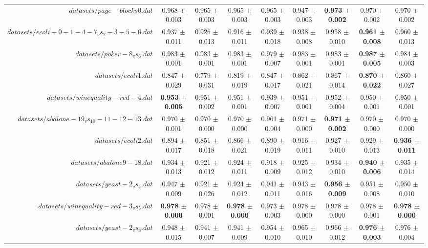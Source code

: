 \begin{table}[!ht]
{\begin{tabular}{r c c c c c c c c}
$datasets/page-blocks0.dat$ & 0.968 $\pm$ 0.003 & 0.965 $\pm$ 0.003 & 0.965 $\pm$ 0.003 & 0.965 $\pm$ 0.003 & 0.947 $\pm$ 0.003 & \textbf{0.973 $\pm$ 0.002} & 0.970 $\pm$ 0.002 & 0.970 $\pm$ 0.002 \\
$datasets/ecoli-0-1-4-7_vs_2-3-5-6.dat$ & 0.937 $\pm$ 0.011 & 0.926 $\pm$ 0.013 & 0.916 $\pm$ 0.011 & 0.939 $\pm$ 0.018 & 0.938 $\pm$ 0.008 & 0.958 $\pm$ 0.010 & \textbf{0.961 $\pm$ 0.008} & 0.960 $\pm$ 0.013 \\
$datasets/poker-8_vs_6.dat$ & 0.983 $\pm$ 0.001 & 0.983 $\pm$ 0.001 & 0.983 $\pm$ 0.001 & 0.979 $\pm$ 0.007 & 0.983 $\pm$ 0.001 & 0.983 $\pm$ 0.001 & \textbf{0.987 $\pm$ 0.005} & 0.984 $\pm$ 0.003 \\
$datasets/ecoli1.dat$ & 0.847 $\pm$ 0.029 & 0.779 $\pm$ 0.031 & 0.819 $\pm$ 0.019 & 0.847 $\pm$ 0.017 & 0.862 $\pm$ 0.021 & 0.867 $\pm$ 0.014 & \textbf{0.870 $\pm$ 0.022} & 0.860 $\pm$ 0.027 \\
$datasets/winequality-red-4.dat$ & \textbf{0.953 $\pm$ 0.005} & 0.951 $\pm$ 0.002 & 0.951 $\pm$ 0.001 & 0.939 $\pm$ 0.007 & 0.951 $\pm$ 0.001 & 0.952 $\pm$ 0.004 & 0.950 $\pm$ 0.001 & 0.950 $\pm$ 0.001 \\
$datasets/abalone-19_vs_10-11-12-13.dat$ & 0.970 $\pm$ 0.001 & 0.970 $\pm$ 0.000 & 0.970 $\pm$ 0.000 & 0.961 $\pm$ 0.004 & 0.971 $\pm$ 0.000 & \textbf{0.971 $\pm$ 0.002} & 0.970 $\pm$ 0.000 & 0.970 $\pm$ 0.000 \\
$datasets/ecoli2.dat$ & 0.894 $\pm$ 0.017 & 0.851 $\pm$ 0.018 & 0.866 $\pm$ 0.021 & 0.890 $\pm$ 0.019 & 0.916 $\pm$ 0.011 & 0.927 $\pm$ 0.010 & 0.929 $\pm$ 0.013 & \textbf{0.936 $\pm$ 0.011} \\
$datasets/abalone9-18.dat$ & 0.934 $\pm$ 0.013 & 0.921 $\pm$ 0.012 & 0.924 $\pm$ 0.011 & 0.918 $\pm$ 0.009 & 0.925 $\pm$ 0.012 & 0.934 $\pm$ 0.010 & \textbf{0.940 $\pm$ 0.006} & 0.935 $\pm$ 0.014 \\
$datasets/yeast-2_vs_4.dat$ & 0.947 $\pm$ 0.009 & 0.921 $\pm$ 0.026 & 0.924 $\pm$ 0.012 & 0.941 $\pm$ 0.011 & 0.943 $\pm$ 0.016 & \textbf{0.956 $\pm$ 0.009} & 0.951 $\pm$ 0.008 & 0.950 $\pm$ 0.010 \\
$datasets/winequality-red-3_vs_5.dat$ & \textbf{0.978 $\pm$ 0.000} & 0.978 $\pm$ 0.001 & \textbf{0.978 $\pm$ 0.000} & 0.973 $\pm$ 0.003 & 0.978 $\pm$ 0.000 & 0.978 $\pm$ 0.000 & 0.978 $\pm$ 0.001 & \textbf{0.978 $\pm$ 0.000} \\
$datasets/yeast-2_vs_8.dat$ & 0.948 $\pm$ 0.015 & 0.941 $\pm$ 0.007 & 0.941 $\pm$ 0.009 & 0.954 $\pm$ 0.010 & 0.965 $\pm$ 0.010 & 0.966 $\pm$ 0.012 & \textbf{0.976 $\pm$ 0.003} & 0.976 $\pm$ 0.004 \\

\end{tabular}}
\end{table}
